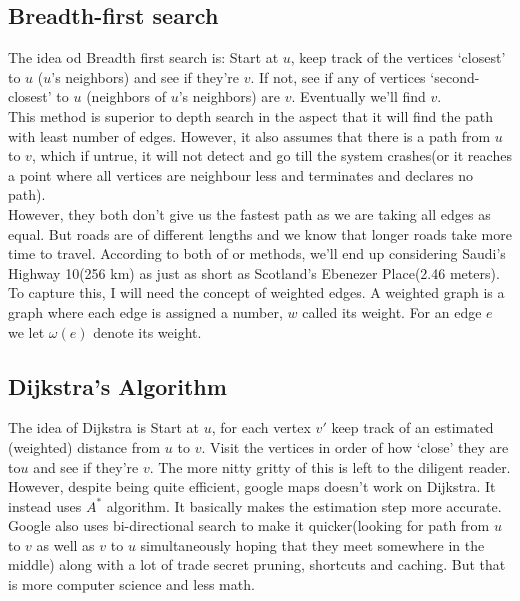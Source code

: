 \subsection{Breadth-first search}
The idea od Breadth first search is: Start at $u$, keep track of the vertices ‘closest’ to $u$ ($u$’s neighbors) and see if they’re $v$. If not, see if any of vertices ‘second-closest’ to $u$ (neighbors of $u$’s neighbors) are $v$. Eventually we'll find $v$.\\
This method is superior to depth search in the aspect that it will find the path with least number of edges. However, it also assumes that there is a path from $u$ to $v$, which if untrue, it will not detect and go till the system crashes(or it reaches a point where all vertices are neighbour less and terminates and declares no path).\\
However, they both don't give us the fastest path as we are taking all edges as equal. But roads are of different lengths and we know that longer roads take more time to travel. According to both of or methods, we'll end up considering Saudi's Highway 10(256 km) as just as short as Scotland's Ebenezer Place(2.46 meters).\\
To capture this, I will need the concept of weighted edges. A weighted graph is a graph where each edge is assigned a number, $w$ called its weight. For an edge $e$ we let $\omega(e)$ denote its weight.
\subsection{Dijkstra’s Algorithm}
The idea of Dijkstra is Start at $u$, for each vertex $v'$ keep track of an estimated (weighted) distance from $u$ to $v$. Visit the vertices in order of how ‘close’ they are to$u$ and see if they’re $v$. The more nitty gritty of this is left to the diligent reader.\\
However, despite being quite efficient, google maps doesn't work on Dijkstra. It instead uses $A^{*}$ algorithm. It basically makes the estimation step more accurate. Google also uses bi-directional search to make it quicker(looking for path from $u$ to $v$ as well as $v$ to $u$ simultaneously hoping that they meet somewhere in the middle) along with a lot of trade secret pruning, shortcuts and caching. But that is more computer science and less math.\\


